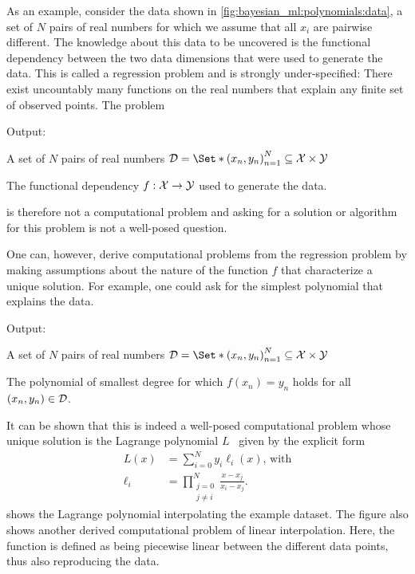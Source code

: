 As an example, consider the data shown in \cref{fig:bayesian_ml:polynomials:data}, a set of $N$ pairs of real numbers for which we assume that all $x_i$ are pairwise different.
The knowledge about this data to be uncovered is the functional dependency between the two data dimensions that were used to generate the data.
This is called a regression problem and is strongly under-specified:
There exist uncountably many functions on the real numbers that explain any finite set of observed points.
The problem
\begin{problem}[Regression]
\label{prob:bayesian_ml:regression}
\begin{labeling}{Output:}
    \item[Input:] A set of $N$ pairs of real numbers $\Dc = \Set*{\left(x_n, y_n\right)}_{n=1}^N \subseteq \Xc \times \Yc$
    \item[Output:] The functional dependency $f : \mathcal{X} \to \mathcal{Y}$ used to generate the data.
\end{labeling}
\end{problem}
is therefore not a computational problem and asking for a solution or algorithm for this problem is not a well-posed question.

One can, however, derive computational problems from the regression problem by making assumptions about the nature of the function $f$ that characterize a unique solution.
For example, one could ask for the simplest polynomial that explains the data.
\begin{problem}
\label{prob:bayesian_ml:lagrange}
\begin{labeling}{Output:}
    \item[Input:] A set of $N$ pairs of real numbers $\Dc = \Set*{\left(x_n, y_n\right)}_{n=1}^N \subseteq \Xc \times \Yc$
    \item[Output:] The polynomial of smallest degree for which $f(x_n) = y_n$ holds for all $(x_n, y_n) \in \mathcal{D}$.
\end{labeling}
\end{problem}
It can be shown that this is indeed a well-posed computational problem whose unique solution is the Lagrange polynomial $L$~\parencite{waring_vii._1779} given by the explicit form
\begin{equation}
    \begin{split}
        L(x) &= \sum_{i=0}^N y_i \ell_i(x)\text{, with} \\
        \ell_i &= \prod_{\substack{j = 0\\j \neq i}}^N \frac{x - x_j}{x_i - x_j}.
    \end{split}
    \label{eq:bayesian_ml:lagrange}
\end{equation}
 shows the Lagrange polynomial interpolating the example dataset.
The figure also shows another derived computational problem of linear interpolation.
Here, the function is defined as being piecewise linear between the different data points, thus also reproducing the data.

